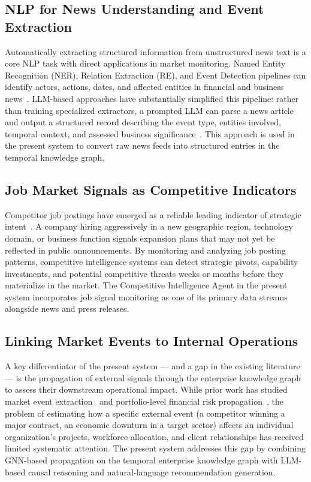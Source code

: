 \subsection{NLP for News Understanding and Event Extraction}

Automatically extracting structured information from unstructured news text
is a core NLP task with direct applications in market monitoring. Named
Entity Recognition (NER), Relation Extraction (RE), and Event Detection
pipelines can identify actors, actions, dates, and affected entities in
financial and business news~\cite{devlin2019bert}. LLM-based approaches
have substantially simplified this pipeline: rather than training
specialized extractors, a prompted LLM can parse a news article and output
a structured record describing the event type, entities involved, temporal
context, and assessed business significance~\cite{wei2022chainofthought}.
This approach is used in the present system to convert raw news feeds into
structured entries in the temporal knowledge graph.

\subsection{Job Market Signals as Competitive Indicators}

Competitor job postings have emerged as a reliable leading indicator of
strategic intent~\cite{burning2023jobsignals}. A company hiring aggressively
in a new geographic region, technology domain, or business function signals
expansion plans that may not yet be reflected in public announcements. By
monitoring and analyzing job posting patterns, competitive intelligence
systems can detect strategic pivots, capability investments, and potential
competitive threats weeks or months before they materialize in the market.
The Competitive Intelligence Agent in the present system incorporates job
signal monitoring as one of its primary data streams alongside news and
press releases.

\subsection{Linking Market Events to Internal Operations}

A key differentiator of the present system — and a gap in the existing
literature — is the propagation of external signals through the enterprise
knowledge graph to assess their downstream operational impact. While prior
work has studied market event extraction~\cite{ding2014event} and
portfolio-level financial risk propagation~\cite{acemoglu2012cascade}, the
problem of estimating how a specific external event (a competitor winning
a major contract, an economic downturn in a target sector) affects an
individual organization's projects, workforce allocation, and client
relationships has received limited systematic attention. The present system
addresses this gap by combining GNN-based propagation on the temporal
enterprise knowledge graph with LLM-based causal reasoning and
natural-language recommendation generation.


